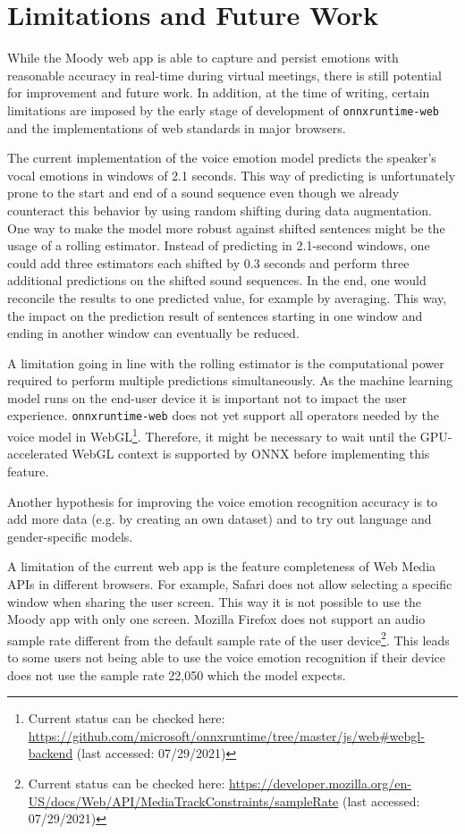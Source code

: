 \section{Limitations and Future Work}
\label{sec:limitations_and_future_work}
While the Moody web app is able to capture and persist emotions with reasonable accuracy in real-time during virtual meetings, there is still potential for improvement and future work. In addition, at the time of writing, certain limitations are imposed by the early stage of development of \texttt{onnxruntime-web} and the implementations of web standards in major browsers.

The current implementation of the voice emotion model predicts the speaker's vocal emotions in windows of 2.1 seconds. This way of predicting is unfortunately prone to the start and end of a sound sequence even though we already counteract this behavior by using random shifting during data augmentation. One way to make the model more robust against shifted sentences might be the usage of a rolling estimator. Instead of predicting in 2.1-second windows, one could add three estimators each shifted by 0.3 seconds and perform three additional predictions on the shifted sound sequences. In the end, one would reconcile the results to one predicted value, for example by averaging. This way, the impact on the prediction result of sentences starting in one window and ending in another window can eventually be reduced.

A limitation going in line with the rolling estimator is the computational power required to perform multiple predictions simultaneously. As the machine learning model runs on the end-user device it is important not to impact the user experience. \texttt{onnxruntime-web} does not yet support all operators needed by the voice model in WebGL\footnote{Current status can be checked here: \url{https://github.com/microsoft/onnxruntime/tree/master/js/web#webgl-backend} (last accessed: 07/29/2021)}. Therefore, it might be necessary to wait until the GPU-accelerated WebGL context is supported by ONNX before implementing this feature.

Another hypothesis for improving the voice emotion recognition accuracy is to add more data (e.g. by creating an own dataset) and to try out language and gender-specific models.

A limitation of the current web app is the feature completeness of Web Media APIs in different browsers. For example, Safari does not allow selecting a specific window when sharing the user screen. This way it is not possible to use the Moody app with only one screen. Mozilla Firefox does not support an audio sample rate different from the default sample rate of the user device\footnote{Current status can be checked here: \url{https://developer.mozilla.org/en-US/docs/Web/API/MediaTrackConstraints/sampleRate} (last accessed: 07/29/2021)}. This leads to some users not being able to use the voice emotion recognition if their device does not use the sample rate 22,050 which the model expects.

